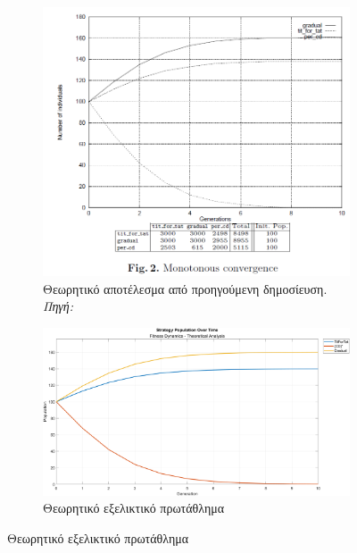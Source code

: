 \documentclass[12pt]{report}
\begin{document}
\begin{figure}[htbp]
    \centering

    \begin{subfigure}[b]{0.5\linewidth}
        \centering
        \includegraphics[width=\linewidth]{Figures Fitness Dynamics/2.png}
        \caption{Θεωρητικό αποτέλεσμα από προηγούμενη δημοσίευση. \textit{Πηγή:} \protect\cite{mathieu1999}}
        \label{fig:fig_fit_2_a}
    \end{subfigure}
    \hfill
    \begin{subfigure}[b]{0.5\linewidth}
        \centering
        \includegraphics[width=\linewidth]{Figures Fitness Dynamics/example2.png}
        \caption{Θεωρητικό εξελικτικό πρωτάθλημα}
        \label{fig:fig_fit_2_b}
    \end{subfigure}

\end{figure}
\end{document}
